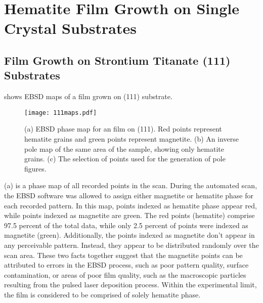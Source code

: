 

\chapter{Hematite Film Growth on Single Crystal Substrates}
\label{ch:single.crystal.growth}




\section{Film Growth on Strontium Titanate (111) Substrates}
\label{sec:single.growth.111}


 shows EBSD maps of a film grown on  (111) substrate. 
\begin{figure}
	\texttt{[image: 111maps.pdf]}
	\caption[EBSD maps for film on  (111)]{%
		(a) EBSD phase map for an  film on  
		(111). Red points represent hematite grains and green points 
		represent magnetite. (b) An inverse pole map of the same area 
		of the sample, showing only hematite grains. (c) The selection 
		of points used for the generation of pole figures.}
	\label{fig:111maps}
\end{figure}
(a) is a phase map of all recorded points in the scan. During the automated scan, the EBSD software was allowed to assign either magnetite or hematite phase for each recorded pattern. In this map, points indexed as hematite phase appear red, while points indexed as magnetite are green. The red points (hematite) comprise 97.5 percent of the total data, while only 2.5 percent of points were indexed as magnetite (green). Additionally, the points indexed as magnetite don't appear in any perceivable pattern. Instead, they appear to be distributed randomly over the scan area. These two facts together suggest that the magnetite points can be attributed to errors in the EBSD process, such as poor pattern quality, surface contamination, or areas of poor film quality, such as the macroscopic particles resulting from the pulsed laser deposition process. Within the experimental limit, the film is considered to be comprised of solely hematite phase. 

